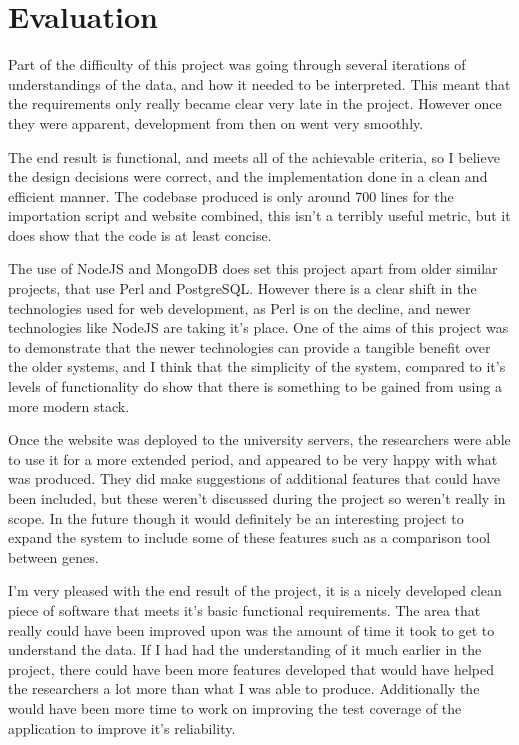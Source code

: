 \chapter{Evaluation}
Part of the difficulty of this project was going through several iterations of understandings of the data, and how it needed to be interpreted. This meant that the requirements only really became clear very late in the project. However once they were apparent, development from then on went very smoothly.

The end result is functional, and meets all of the achievable criteria, so I believe the design decisions were correct, and the implementation done in a clean and efficient manner. The codebase produced is only around 700 lines for the importation script and website combined, this isn't a terribly useful metric, but it does show that the code is at least concise.

The use of NodeJS and MongoDB does set this project apart from older similar projects, that use Perl and PostgreSQL. However there is a clear shift in the technologies used for web development, as Perl is on the decline\cite{perl-market}, and newer technologies like NodeJS are taking it's place. One of the aims of this project was to demonstrate that the newer technologies can provide a tangible benefit over the older systems, and I think that the simplicity of the system, compared to it's levels of functionality do show that there is something to be gained from using a more modern stack. 

Once the website was deployed to the university servers, the researchers were able to use it for a more extended period, and appeared to be very happy with what was produced. They did make suggestions of additional features that could have been included, but these weren't discussed during the project so weren't really in scope. In the future though it would definitely be an interesting project to expand the system to include some of these features such as a comparison tool between genes.

I'm very pleased with the end result of the project, it is a nicely developed clean piece of software that meets it's basic functional requirements. The area that really could have been improved upon was the amount of time it took to get to understand the data. If I had had the understanding of it much earlier in the project, there could have been more features developed that would have helped the researchers a lot more than what I was able to produce. Additionally the would have been more time to work on improving the test coverage of the application to improve it's reliability.

